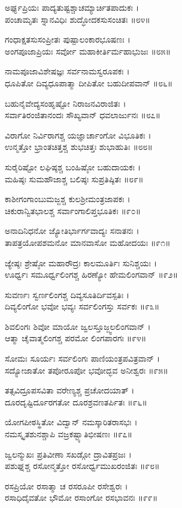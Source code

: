 ಅರ್ಘ್ಯಪ್ರಿಯಃ ಪಾದ್ಯತುಷ್ಟಶ್ಚಾಚಮ್ಯಾರ್ಚಿತಪಾದುಕಃ ।\\
ಪಂಚಾಮೃತಃ ಸ್ನಾನವಿಧಿಃ ಶುದ್ಧೋದಕಸುಸಂಚಿತಃ ॥೮೪॥

ಗಂಧಾಕ್ಷತಸುಸಂಪ್ರೀತಃ ಪುಷ್ಪಾಲಂಕಾರಭೂಷಣಃ ।\\
ಅಂಗಪೂಜಾಪ್ರಿಯಃ ಸರ್ವೋ ಮಹಾಕೀರ್ತಿರ್ಮಹಾಭುಜಃ ॥೮೫॥

ನಾಮಪೂಜಾವಿಶೇಷಜ್ಞಃ ಸರ್ವನಾಮಸ್ವರೂಪಕಃ ।\\
ಧೂಪಿತೋ ದಿವ್ಯಧೂಪಾತ್ಮಾ ದೀಪಿತೋ ಬಹುದೀಪವಾನ್ ॥೮೬॥

ಬಹುನೈವೇದ್ಯಸಂಹೃಷ್ಟೋ ನಿರಾಜನವಿರಾಜಿತಃ ।\\
ಸರ್ವಾತಿರಂಜಿತಾನಂದಃ ಸೌಖ್ಯವಾನ್ ಧವಲಾರ್ಜುನಃ ॥೮೭॥

ವಿರಾಗೋ ನಿರ್ವಿರಾಗಶ್ಚ ಯಜ್ಞಾರ್ಚಾಂಗೋ ವಿಭೂತಿಕಃ ।\\
ಉನ್ಮತ್ತೋ ಭ್ರಾಂತಚಿತ್ತಶ್ಚ ಶುಭಚಿತ್ತಃ ಶುಭಾಹುತಿಃ ॥೮೮॥

ಸುರೈರಿಷ್ಟೋ ಲಘಿಷ್ಠಶ್ಚ ಬಂಹಿಷ್ಠೋ ಬಹುದಾಯಕಃ ।\\
ಮಹಿಷ್ಠಃ ಸುಮಹೌಜಾಶ್ಚ ಬಲಿಷ್ಠಃ ಸುಪ್ರತಿಷ್ಠಿತಃ ॥೮೯॥

ಕಾಶೀಗಂಗಾಂಬುಮಜ್ಜಶ್ಚ ಕುಲಶ್ರೀಮಂತ್ರಜಾಪಕಃ ।\\
ಚಿಕುರಾನ್ವಿತಭಾಲಶ್ಚ ಸರ್ವಾಂಗಾಲಿಪ್ತಭೂತಿಕಃ ॥೯೦॥

ಅನಾದಿನಿಧನೋ ಜ್ಯೋತಿರ್ಭಾರ್ಗವಾದ್ಯಃ ಸನಾತನಃ ।\\
ತಾಪತ್ರಯೋಪಶಮನೋ ಮಾನವಾಸೋ ಮಹೋದಯಃ ॥೯೧॥

ಜ್ಯೇಷ್ಠಃ ಶ್ರೇಷ್ಠೋ ಮಹಾರೌದ್ರಃ ಕಾಲಮೂರ್ತಿಃ ಸುನಿಶ್ಚಯಃ ।\\
ಊರ್ಧ್ವಃ ಸಮೂರ್ಧ್ವಲಿಂಗಶ್ಚ ಹಿರಣ್ಯೋ ಹೇಮಲಿಂಗವಾನ್ ॥೯೨॥

ಸುವರ್ಣಃ ಸ್ವರ್ಣಲಿಂಗಶ್ಚ ದಿವ್ಯಸೂತಿರ್ದಿವಸ್ಪತಿಃ ।\\
ದಿವ್ಯಲಿಂಗೋ ಭವೋ ಭವ್ಯಃ ಸರ್ವಲಿಂಗಸ್ತು ಸರ್ವಕಃ ॥೯೩॥

ಶಿವಲಿಂಗಃ ಶಿವೋ ಮಾಯೋ ಜ್ವಲಸ್ತೂಜ್ಜ್ವಲಲಿಂಗವಾನ್ ।\\
ಆತ್ಮಾ ಚೈವಾತ್ಮಲಿಂಗಶ್ಚ ಪರಮೋ ಲಿಂಗಪಾರಗಃ ॥೯೪॥

ಸೋಮಃ ಸೂರ್ಯಃ ಸರ್ವಲಿಂಗಃ ಪಾಣಿಯಂತ್ರಪವಿತ್ರವಾನ್ ।\\
ಸದ್ಯೋಜಾತೋ ತಪೋರೂಪೋ ಭವೋದ್ಭವ ಅನೀಶ್ವರಃ ॥೯೫॥

ತತ್ಸವಿದ್ರೂಪಸವಿತಾ ವರೇಣ್ಯಶ್ಚ ಪ್ರಚೋದಯಾತ್ ।\\
ದೂರದೃಷ್ಟಿರ್ದೂರಗತೋ ದೂರಶ್ರವಣತರ್ಪಿತಃ ॥೯೬॥

ಯೋಗಪೀಠಸ್ಥಿತೋ ವಿದ್ವಾನ್ ನಮಸ್ಕಾರಿತರಾಸಭಃ ।\\
ನಮಸ್ಕೃತಶುನಶ್ಚಾಪಿ ವಜ್ರಕಷ್ಟ್ಯಾತಿಭೀಷಣಃ ॥೯೭॥

ಜ್ವಲನ್ಮುಖಃ ಪ್ರತಿವೀಣಾ ಸಖಡ್ಗೋ ದ್ರಾವಿತಪ್ರಜಃ ।\\
ಪಶುಘ್ನಶ್ಚ ರಸೋನ್ಮತ್ತೋ ರಸೋರ್ಧ್ವಮುಖರಂಜಿತಃ ॥೯೮॥

ರಸಪ್ರಿಯೋ ರಸಾತ್ಮಾ ಚ ರಸರೂಪೀ ರಸೇಶ್ವರಃ ।\\
ರಸಾಧಿದೈವತೋ ಭೌಮೋ ರಸಾಂಗೋ ರಸಭಾವನಃ ॥೯೯॥

